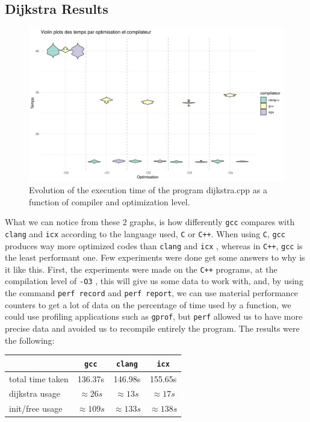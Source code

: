 \documentclass{rapport}
\newcommand{\gcc}{\texttt{gcc} }
\newcommand{\icx}{\texttt{icx} }
\newcommand{\clang}{\texttt{clang} }
\newcommand{\optithree}{\texttt{-O3} }
\begin{document}
\subsection{Dijkstra Results}
\begin{figure}[H]
\centering
\includegraphics[width=1\textwidth]{img/plots/violin_plot_dijkstra.png}
\caption{Evolution of the execution time of the program dijkstra.cpp as a function of compiler and optimization level.}
\label{fig:image2}
\end{figure}
What we can notice from these 2 graphs, is how differently \gcc compares with \clang and \icx according to the language used, \texttt{C} or \texttt{C++}. 
When using \texttt{C}, \gcc produces way more optimized codes than \clang and \icx, whereas in \texttt{C++}, \gcc is the least performant one. \newline
Few experiments were done get some answers to why is it like this. \newline\newline
First, the experiments were made on the \texttt{C++} programs, at the compilation level of \optithree, this will give us some data to work with, and, 
by using the command \texttt{perf record} and \texttt{perf report}, we can use material performance counters to get a lot of data on the percentage of time used 
by a function, we could use profiling applications such as \texttt{gprof}, but \texttt{perf} allowed us to have more precise data and avoided us to recompile
entirely the program.\newline \newline
The results were the following:
\begin{table}[H]
\centering
\begin{tabular}{|l|c|c|c|}
\hline
                           & \gcc    & \clang  & \icx   \\
\hline
total time taken & 136.37s       & 146.98s       & 155.65s \\
dijkstra usage   & $\approx26s$  & $\approx13s$  & $\approx17s$    \\
init/free usage  & $\approx109s$ & $\approx133s$ & $\approx138s$   \\
\hline
\end{tabular}
\end{table}
\end{document}
